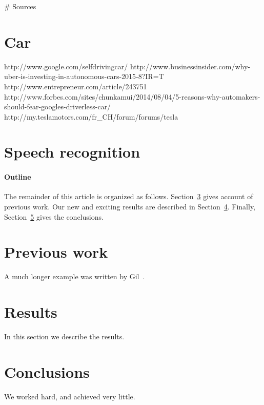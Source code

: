 \documentclass[12pt]{article}
\begin{document}
# Sources

\section{Car}

http://www.google.com/selfdrivingcar/
http://www.businessinsider.com/why-uber-is-investing-in-autonomous-cars-2015-8?IR=T
http://www.entrepreneur.com/article/243751
http://www.forbes.com/sites/chunkamui/2014/08/04/5-reasons-why-automakers-should-fear-googles-driverless-car/
http://my.teslamotors.com/fr_CH/forum/forums/tesla%

\section{Speech recognition}



\paragraph{Outline}
The remainder of this article is organized as follows.
Section~\ref{previous work} gives account of previous work.
Our new and exciting results are described in Section~\ref{results}.
Finally, Section~\ref{conclusions} gives the conclusions.

\section{Previous work}\label{previous work}
A much longer \LaTeXe{} example was written by Gil~\cite{Gil:02}.

\section{Results}\label{results}
In this section we describe the results.

\section{Conclusions}\label{conclusions}
We worked hard, and achieved very little.



\end{document}
